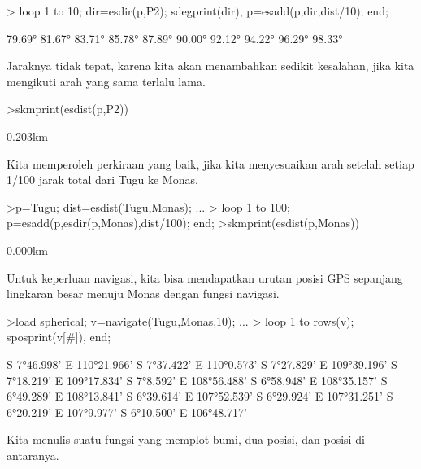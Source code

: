 \documentclass[a4paper,10pt]{article}
\begin{document}
\begin{eulernotebook}
\begin{eulercomment}
\begin{eulercomment}
\begin{eulercomment}
\begin{eulercomment}
\begin{eulercomment}
\begin{eulercomment}
\begin{eulercomment}
\begin{eulercomment}
\begin{eulercomment}
\begin{eulercomment}
\begin{eulercomment}
\begin{eulercomment}
\begin{eulercomment}
\begin{eulercomment}
\begin{eulercomment}
\begin{eulercomment}
\begin{eulercomment}
\begin{eulercomment}
\begin{eulerprompt}
>  loop 1 to 10; dir=esdir(p,P2); sdegprint(dir), p=esadd(p,dir,dist/10); end;
\end{eulerprompt}
\begin{euleroutput}
       79.69°
       81.67°
       83.71°
       85.78°
       87.89°
       90.00°
       92.12°
       94.22°
       96.29°
       98.33°
\end{euleroutput}
\begin{eulercomment}
Jaraknya tidak tepat, karena kita akan menambahkan sedikit kesalahan,
jika kita mengikuti arah yang sama terlalu lama.
\end{eulercomment}
\begin{eulerprompt}
>skmprint(esdist(p,P2))
\end{eulerprompt}
\begin{euleroutput}
       0.203km
\end{euleroutput}
\begin{eulercomment}
Kita memperoleh perkiraan yang baik, jika kita menyesuaikan arah
setelah setiap 1/100 jarak total dari Tugu ke Monas.
\end{eulercomment}
\begin{eulerprompt}
>p=Tugu; dist=esdist(Tugu,Monas); ...
>  loop 1 to 100; p=esadd(p,esdir(p,Monas),dist/100); end;
>skmprint(esdist(p,Monas))
\end{eulerprompt}
\begin{euleroutput}
       0.000km
\end{euleroutput}
\begin{eulercomment}
Untuk keperluan navigasi, kita bisa mendapatkan urutan posisi GPS
sepanjang lingkaran besar menuju Monas dengan fungsi navigasi.
\end{eulercomment}
\begin{eulerprompt}
>load spherical; v=navigate(Tugu,Monas,10); ...
>  loop 1 to rows(v); sposprint(v[#]), end;
\end{eulerprompt}
\begin{euleroutput}
  S 7°46.998' E 110°21.966'
  S 7°37.422' E 110°0.573'
  S 7°27.829' E 109°39.196'
  S 7°18.219' E 109°17.834'
  S 7°8.592' E 108°56.488'
  S 6°58.948' E 108°35.157'
  S 6°49.289' E 108°13.841'
  S 6°39.614' E 107°52.539'
  S 6°29.924' E 107°31.251'
  S 6°20.219' E 107°9.977'
  S 6°10.500' E 106°48.717'
\end{euleroutput}
\begin{eulercomment}
Kita menulis suatu fungsi yang memplot bumi, dua posisi, dan posisi di
antaranya.
\end{eulercomment}

\end{eulercomment}
\end{eulercomment}
\end{eulercomment}
\end{eulercomment}
\end{eulercomment}
\end{eulercomment}
\end{eulercomment}
\end{eulercomment}
\end{eulercomment}
\end{eulercomment}
\end{eulercomment}
\end{eulercomment}
\end{eulercomment}
\end{eulercomment}
\end{eulercomment}
\end{eulercomment}
\end{eulercomment}
\end{eulercomment}
\end{eulernotebook}
\end{document}
